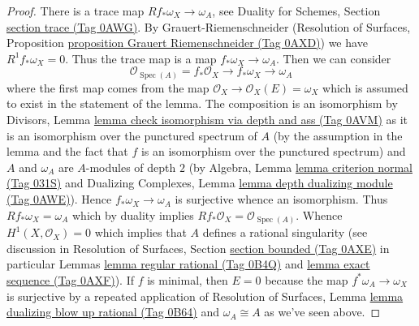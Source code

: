\documentclass{amsart}
\theoremstyle{plain}
\theoremstyle{definition}
\theoremstyle{remark}
\numberwithin{equation}{subsection}
\def\Spec{\mathop{\mathrm{Spec}}}
\begin{document}
\begin{proof}
There is a trace map $Rf_*\omega_X \to \omega_A$, see
Duality for Schemes, Section \href{https://stacks.math.columbia.edu/tag/0AWG}{section trace (Tag 0AWG)}.
By Grauert-Riemenschneider
(Resolution of Surfaces,
Proposition \href{https://stacks.math.columbia.edu/tag/0AXD}{proposition Grauert Riemenschneider (Tag 0AXD)})
we have $R^1f_*\omega_X = 0$.
Thus the trace map is a map $f_*\omega_X \to \omega_A$.
Then we can consider
$$
\mathcal{O}_{\Spec(A)} = f_*\mathcal{O}_X \to f_*\omega_X \to \omega_A
$$
where the first map comes from the map
$\mathcal{O}_X \to \mathcal{O}_X(E) = \omega_X$ which is
assumed to exist in the statement of the lemma.
The composition is an isomorphism by Divisors, Lemma
\href{https://stacks.math.columbia.edu/tag/0AVM}{lemma check isomorphism via depth and ass (Tag 0AVM)}
as it is an isomorphism over the punctured spectrum of $A$
(by the assumption in the lemma and the fact that $f$ is an isomorphism
over the punctured spectrum) and $A$ and $\omega_A$
are $A$-modules of depth $2$ (by
Algebra, Lemma \href{https://stacks.math.columbia.edu/tag/031S}{lemma criterion normal (Tag 031S)} and
Dualizing Complexes, Lemma \href{https://stacks.math.columbia.edu/tag/0AWE}{lemma depth dualizing module (Tag 0AWE)}).
Hence $f_*\omega_X \to \omega_A$ is surjective whence an isomorphism.
Thus $Rf_*\omega_X = \omega_A$ which by duality implies
$Rf_*\mathcal{O}_X = \mathcal{O}_{\Spec(A)}$.
Whence $H^1(X, \mathcal{O}_X) = 0$ which implies that $A$
defines a rational singularity (see discussion in
Resolution of Surfaces, Section
\href{https://stacks.math.columbia.edu/tag/0AXE}{section bounded (Tag 0AXE)} in particular
Lemmas \href{https://stacks.math.columbia.edu/tag/0B4Q}{lemma regular rational (Tag 0B4Q)} and
\href{https://stacks.math.columbia.edu/tag/0AXF}{lemma exact sequence (Tag 0AXF)}).
If $f$ is minimal, then $E = 0$ because the map
$f^*\omega_A \to \omega_X$ is surjective by
a repeated application of Resolution of Surfaces, Lemma
\href{https://stacks.math.columbia.edu/tag/0B64}{lemma dualizing blow up rational (Tag 0B64)}
and $\omega_A \cong A$ as we've seen above.
\end{proof}
\end{document}
